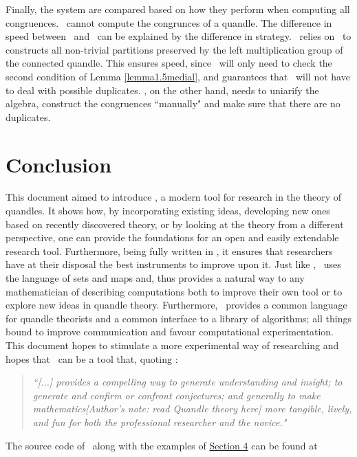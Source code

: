 \documentclass{mcom-l}
\begin{document}
\noindent Finally, the system are compared based on how they perform when computing all congruences. \rig~cannot compute the congrunces of a quandle. The difference in speed between \Software~and \cream~can be explained by the difference in strategy. \Software~relies on \magma~to constructs all non-trivial partitions preserved by the left multiplication group of the connected quandle. This ensures speed, since \Software~will only need to check the second condition of Lemma \ref{lemma1.5medial}, and guarantees that \Software~will not have to deal with possible duplicates. \cream, on the other hand, needs to uniarify the algebra, construct the congruences ``manually" and make sure that there are no duplicates.

\section{Conclusion}
\noindent This document aimed to introduce \Software, a modern tool for research in the theory of quandles. It shows how, by incorporating existing ideas, developing new ones based on recently discovered theory, or by looking at the theory from a different perspective, one can provide the foundations for an open and easily extendable research tool. Furthermore, being fully written in \magma, it ensures that researchers have at their disposal the best instruments to improve upon it. \newline
Just like \magma, \Software~uses the language of sets and maps and, thus provides a natural way to any mathematician of describing computations both to improve their own tool or to explore new ideas in quandle theory. Furthermore, \Software~provides a common language for quandle theorists and a common interface to a library of algorithms; all things bound to improve communication and favour computational experimentation. This document hopes to stimulate a more experimental way of researching and hopes that \Software~can be a tool that, quoting \cite{borwein2004experimentation}:
\begin{quote}
    \emph{``[...] provides a compelling way to generate understanding and insight; to generate and confirm or confront conjectures; and generally to make mathematics[Author's note: read \textit{Quandle theory} here] more tangible, lively, and fun for both the professional researcher and the novice."}
\end{quote}
The source code of \Software~along with the examples of \hyperref[AppSection]{Section 4} can be found at 
\end{document}
